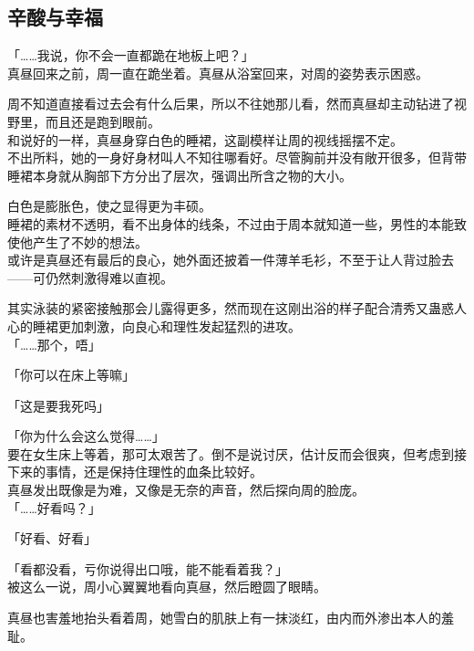 \subsection{辛酸与幸福}

「……我说，你不会一直都跪在地板上吧？」\\

真昼回来之前，周一直在跪坐着。真昼从浴室回来，对周的姿势表示困惑。

周不知道直接看过去会有什么后果，所以不往她那儿看，然而真昼却主动钻进了视野里，而且还是跑到眼前。\\

和说好的一样，真昼身穿白色的睡裙，这副模样让周的视线摇摆不定。\\

不出所料，她的一身好身材叫人不知往哪看好。尽管胸前并没有敞开很多，但背带睡裙本身就从胸部下方分出了层次，强调出所含之物的大小。

白色是膨胀色，使之显得更为丰硕。\\

睡裙的素材不透明，看不出身体的线条，不过由于周本就知道一些，男性的本能致使他产生了不妙的想法。\\

或许是真昼还有最后的良心，她外面还披着一件薄羊毛衫，不至于让人背过脸去——可仍然刺激得难以直视。

其实泳装的紧密接触那会儿露得更多，然而现在这刚出浴的样子配合清秀又蛊惑人心的睡裙更加刺激，向良心和理性发起猛烈的进攻。\\

「……那个，唔」

「你可以在床上等嘛」

「这是要我死吗」

「你为什么会这么觉得……」\\

要在女生床上等着，那可太艰苦了。倒不是说讨厌，估计反而会很爽，但考虑到接下来的事情，还是保持住理性的血条比较好。\\

真昼发出既像是为难，又像是无奈的声音，然后探向周的脸庞。\\

「……好看吗？」

「好看、好看」

「看都没看，亏你说得出口哦，能不能看着我？」\\

被这么一说，周小心翼翼地看向真昼，然后瞪圆了眼睛。

真昼也害羞地抬头看着周，她雪白的肌肤上有一抹淡红，由内而外渗出本人的羞耻。

